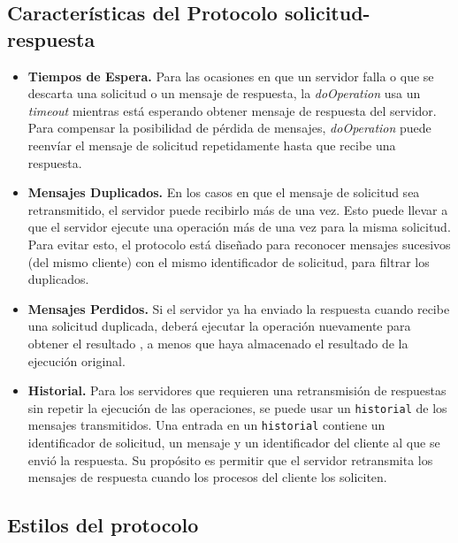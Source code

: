   
\subsection{Características del Protocolo solicitud-respuesta}
 
 
\begin{itemize}
	\item \textbf{Tiempos de Espera.} Para las  ocasiones en  que un servidor  falla o que  se descarta una solicitud o un mensaje de respuesta,  la \textit{doOperation} usa un \textit{timeout} mientras está esperando obtener  mensaje de respuesta del servidor. Para compensar la posibilidad de pérdida de mensajes,  \textit{doOperation} puede reenvíar el mensaje de solicitud repetidamente hasta que recibe una respuesta.
	
	\item \textbf{Mensajes Duplicados.} En los casos en que el mensaje de solicitud sea  retransmitido, el servidor puede recibirlo más de una vez. %
	Esto puede llevar a que el servidor ejecute una operación más  de una vez para la misma solicitud. Para evitar esto, el protocolo está diseñado para reconocer  mensajes sucesivos (del mismo cliente) con el mismo identificador de solicitud, para filtrar los duplicados. 
	
	\item \textbf{Mensajes Perdidos.} Si el servidor ya ha enviado la respuesta cuando recibe una solicitud duplicada, deberá ejecutar la operación nuevamente para obtener el resultado , a menos que haya almacenado el resultado de la ejecución original.  %
	
	\item \textbf{Historial.}
	Para los servidores que requieren una retransmisión de respuestas sin repetir la  ejecución de las operaciones, se puede usar  un \texttt{historial} de los mensajes transmitidos.
	Una entrada en un \texttt{historial} contiene un identificador de solicitud, un mensaje y un identificador del cliente al que se envió la respuesta. Su propósito es permitir que el servidor retransmita los mensajes de respuesta cuando los procesos del cliente los soliciten. 
\end{itemize}
 

\subsection{Estilos del protocolo}   


